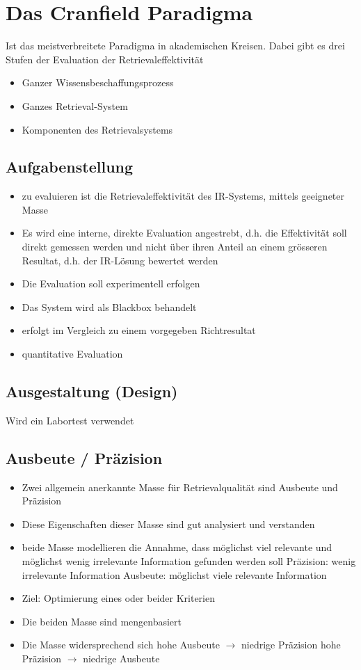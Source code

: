 \documentclass{report}
\theoremstyle{definition}
\theoremstyle{example}
\begin{document}
\section{Das Cranfield Paradigma}
Ist das meistverbreitete Paradigma in akademischen Kreisen. Dabei gibt es drei Stufen der Evaluation der Retrievaleffektivität
\begin{itemize}
   \item Ganzer Wissensbeschaffungsprozess
   \item Ganzes Retrieval-System
   \item Komponenten des Retrievalsystems
\end{itemize}

\subsection{Aufgabenstellung}
\begin{itemize}
   \item zu evaluieren ist die Retrievaleffektivität des IR-Systems, mittels geeigneter Masse
   \item Es wird eine interne, direkte Evaluation angestrebt, d.h. die Effektivität soll direkt gemessen werden und nicht über ihren Anteil an einem grösseren Resultat, d.h. der IR-Lösung bewertet werden
   \item Die Evaluation soll experimentell erfolgen
   \item Das System wird als Blackbox behandelt
   \item erfolgt im Vergleich zu einem vorgegeben Richtresultat
   \item quantitative Evaluation
\end{itemize}

\subsection{Ausgestaltung (Design)}
Wird ein Labortest verwendet

\subsection{Ausbeute / Präzision}

\begin{itemize}
   \item Zwei allgemein anerkannte Masse für Retrievalqualität sind Ausbeute und Präzision
   \item Diese Eigenschaften dieser Masse sind gut analysiert und verstanden
   \item beide Masse modellieren die Annahme, dass möglichst viel relevante und möglichst wenig irrelevante Information gefunden werden soll
   \subitem Präzision: wenig irrelevante Information
   \subitem Ausbeute: möglichst viele relevante Information 
   \item Ziel: Optimierung eines oder beider Kriterien
   \item Die beiden Masse sind mengenbasiert
   \item Die Masse widersprechend sich
   \subitem hohe Ausbeute $\rightarrow$ niedrige Präzision
   \subitem hohe Präzision $\rightarrow$ niedrige Ausbeute 
\end{itemize}
\end{document}

